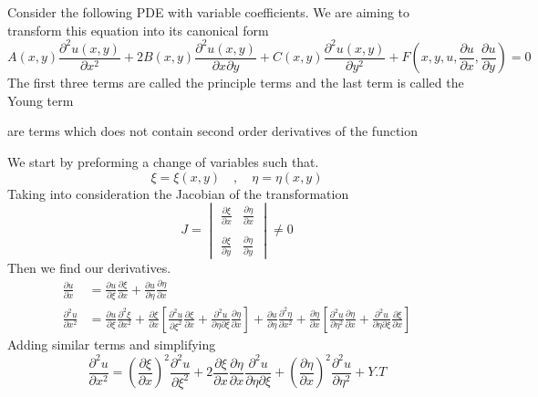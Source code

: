 Consider the following PDE with variable coefficients. We are aiming to transform this equation into its canonical form
\begin{equation}
A\left(x,y\right)\frac{\partial^2 u\left(x,y\right)}{\partial x^2} + 2B\left(x,y\right)\frac{\partial^2 u\left(x,y\right)}{\partial x\partial y}+C\left(x,y\right)\frac{\partial^2 u\left(x,y\right)}{\partial y^2}+F\left(x,y,u,\frac{\partial u}{\partial x},\frac{\partial u}{\partial y}\right) = 0
\end{equation}
The first three terms are called the principle terms and the last term is called the Young term
\vspace*{.2cm}
\begin{definition}
    are terms which does not contain second order derivatives of the function
\end{definition}
\par
We start by preforming a change of variables such that.
\[
    \xi = \xi\left(x,y\right)\quad,\quad\eta = \eta\left(x,y\right)    
\]
Taking into consideration the Jacobian of the transformation
\[
    J =\begin{vmatrix} \frac{\partial\xi}{\partial x}  & \frac{\partial\eta}{\partial x} 
        \\\\
        \frac{\partial\xi}{\partial y} & \frac{\partial\eta}{\partial y} \end{vmatrix} \neq 0    
\]
Then we find our derivatives.
\begin{align*}
\frac{\partial u}{\partial x} &= \frac{\partial u}{\partial\xi}\frac{\partial\xi}{\partial x}+\frac{\partial u}{\partial\eta}\frac{\partial\eta}{\partial x}
\\
\frac{\partial^2 u}{\partial x^2} &= \frac{\partial u}{\partial\xi}\frac{\partial^2\xi}{\partial x^2}+\frac{\partial\xi}{\partial x}\left[\frac{\partial^2 u}{\partial\xi^2}\frac{\partial\xi}{\partial x}+\frac{\partial^2 u}{\partial\eta\partial\xi}\frac{\partial\eta}{\partial x}\right]+\frac{\partial u}{\partial\eta}\frac{\partial^2\eta}{\partial x^2}+\frac{\partial\eta}{\partial x}\left[\frac{\partial^2 u}{\partial\eta^2}\frac{\partial\eta}{\partial x}+\frac{\partial^2 u}{\partial\eta\partial\xi}\frac{\partial\xi}{\partial x}\right]
\end{align*}
Adding similar terms and simplifying
\begin{equation}
\frac{\partial^2 u}{\partial x^2} = {(\frac{\partial\xi}{\partial x})}^2\frac{\partial^2 u}{\partial\xi^2}+2\frac{\partial\xi}{\partial x}\frac{\partial\eta}{\partial x}\frac{\partial^2 u}{\partial\eta\partial\xi}+{(\frac{\partial\eta}{\partial x})}^2\frac{\partial^2 u}{\partial\eta^2}+Y.T
\end{equation}

